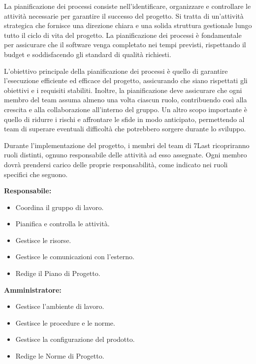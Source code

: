 La pianificazione dei processi consiste nell'identificare, organizzare e controllare le attività necessarie per garantire il successo del progetto. Si tratta di un'attività strategica che fornisce una direzione chiara e una solida struttura gestionale lungo tutto il ciclo di vita del progetto. La pianificazione dei processi è fondamentale per assicurare che il software venga completato nei tempi previsti, rispettando il budget e soddisfacendo gli standard di qualità richiesti.


L’obiettivo principale della pianificazione dei processi è quello di garantire l'esecuzione efficiente ed efficace del progetto, assicurando che siano rispettati gli obiettivi e i requisiti stabiliti. Inoltre, la pianificazione deve assicurare che ogni membro del team assuma almeno una volta ciascun ruolo, contribuendo così alla crescita e alla collaborazione all'interno del gruppo. Un altro scopo importante è quello di ridurre i rischi e affrontare le sfide in modo anticipato, permettendo al team di superare eventuali difficoltà che potrebbero sorgere durante lo sviluppo.


Durante l'implementazione del progetto, i membri del team di 7Last ricopriranno ruoli distinti, ognuno responsabile delle attività ad esso assegnate. Ogni membro dovrà prendersi carico delle proprie responsabilità, come indicato nei ruoli specifici che seguono.

\textbf{Responsabile:}
\begin{itemize}
    \item Coordina il gruppo di lavoro.
    \item Pianifica e controlla le attività.
    \item Gestisce le risorse.
    \item Gestisce le comunicazioni con l’esterno.
    \item Redige il Piano di Progetto.
\end{itemize}

\textbf{Amministratore:}
\begin{itemize}
    \item Gestisce l’ambiente di lavoro.
    \item Gestisce le procedure e le norme.
    \item Gestisce la configurazione del prodotto.
    \item Redige le Norme di Progetto.
\end{itemize}


